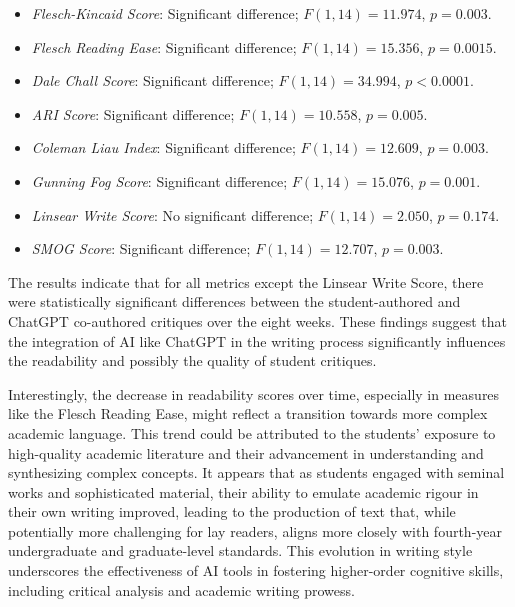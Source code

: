 \begin{itemize}
	\item \textit{Flesch-Kincaid Score}: Significant difference; \(F(1, 14) = 11.974\), \(p = 0.003\).
	\item \textit{Flesch Reading Ease}: Significant difference; \(F(1, 14) = 15.356\), \(p = 0.0015\).
	\item \textit{Dale Chall Score}: Significant difference; \(F(1, 14) = 34.994\), \(p < 0.0001\).
	\item \textit{ARI Score}: Significant difference; \(F(1, 14) = 10.558\), \(p = 0.005\).
	\item \textit{Coleman Liau Index}: Significant difference; \(F(1, 14) = 12.609\), \(p = 0.003\).
	\item \textit{Gunning Fog Score}: Significant difference; \(F(1, 14) = 15.076\), \(p = 0.001\).
	\item \textit{Linsear Write Score}: No significant difference; \(F(1, 14) = 2.050\), \(p = 0.174\).
	\item \textit{SMOG Score}: Significant difference; \(F(1, 14) = 12.707\), \(p = 0.003\).
\end{itemize}

The results indicate that for all metrics except the Linsear Write Score, there were statistically significant differences between the student-authored and ChatGPT co-authored critiques over the eight weeks. These findings suggest that the integration of AI like ChatGPT in the writing process significantly influences the readability and possibly the quality of student critiques.

Interestingly, the decrease in readability scores over time, especially in measures like the Flesch Reading Ease, might reflect a transition towards more complex academic language. This trend could be attributed to the students' exposure to high-quality academic literature and their advancement in understanding and synthesizing complex concepts. It appears that as students engaged with seminal works and sophisticated material, their ability to emulate academic rigour in their own writing improved, leading to the production of text that, while potentially more challenging for lay readers, aligns more closely with fourth-year undergraduate and graduate-level standards. This evolution in writing style underscores the effectiveness of AI tools in fostering higher-order cognitive skills, including critical analysis and academic writing prowess.


